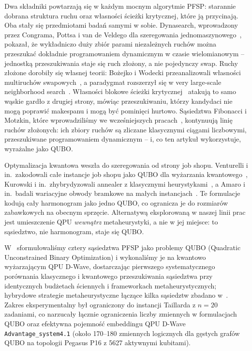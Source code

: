 \documentclass[11pt,a4paper]{article}
\begin{document}
Dwa składniki powtarzają się w każdym mocnym algorytmie PFSP: starannie
dobrana struktura ruchu oraz własności ścieżki krytycznej, które ją
przycinają. Oba stały się przedmiotami badań samymi w sobie. Dynasearch,
wprowadzony przez Congrama, Pottsa i van de Veldego dla szeregowania
jednomaszynowego~\citep{congram02}, pokazał, że wykładniczo duży zbiór
parami niezależnych ruchów można przeszukać dokładnie programowaniem
dynamicznym w czasie wielomianowym -- jednostką przeszukiwania staje
się ruch złożony, a nie pojedynczy swap. Ruchy złożone dorobiły się
własnej teorii: Bożejko i Wodecki przeanalizowali własności
multiruchów swapowych~\citep{bozejko2007}, a paradygmat rozszerzył się
w very large-scale neighborhood search~\citep{ahuja2002}. Własności
blokowe ścieżki krytycznej~\citep{nowicki96,ref_smutnicki,grabowski04}
atakują to samo wąskie gardło z drugiej strony, mówiąc przeszukiwaniu,
którzy kandydaci nie mogą poprawić makespanu i mogą być pominięci
hurtowo. Sąsiedztwa Fibonacci i Motzkin, które wprowadziliśmy we
wcześniejszych pracach~\citep{WojewodzkiBozejkoBPASTS2026,Motzkin_PWR_EXIT},
kontynuują linię ruchów złożonych: ich zbiory ruchów są zliczane
klasycznymi ciągami liczbowymi, przeszukiwane programowaniem
dynamicznym -- i, co ten artykuł wykorzystuje, wyrażalne jako QUBO.

Optymalizacja kwantowa weszła do szeregowania od strony job shopu.
Venturelli i in.\ zakodowali całe instancje job shopu jako QUBO dla
wyżarzania kwantowego~\citep{venturelli16}, Kurowski i in.\
zhybrydyzowali annealer z klasycznymi heurystykami~\citep{kurowski20},
a Amaro i in.\ badali wariacyjne obwody bramkowe na małych
instancjach~\citep{amaro22}. Te formulacje kodują cały harmonogram jako
jedno QUBO, co ogranicza je do rozmiarów zabawkowych na obecnym
sprzęcie. Alternatywą eksplorowaną w naszej linii prac jest umieszczenie
QPU \emph{wewnątrz} metaheurystyki, a nie w jej miejsce: to sąsiedztwo,
nie harmonogram, staje się QUBO.

W~\citep{WojewodzkiBozejkoBPASTS2026} sformułowaliśmy cztery
sąsiedztwa PFSP jako problemy QUBO (Quadratic Unconstrained Binary
Optimization) i wykonaliśmy je na kwantowo wyżarzającym QPU D-Wave,
dostarczając pierwszego systematycznego porównania klasycznego
i kwantowego przeszukiwania sąsiedztwa przy identycznych budżetach
ściennych i frameworkach metaheurystycznych; hybrydowe strategie
metaheurystyczne łączące kilka sąsiedztw zbadano
w~\citep{WojewodzkiBozejko2026}. Zakres eksperymentalny był ograniczony
do instancji Taillarda z $n=20$ zadaniami, co narzucały łącznie
ograniczenia liczby zmiennych w formulacjach QUBO oraz efektywna
pojemność embeddingu QPU D-Wave \texttt{Advantage\_system4.1} (około
170--180 zmiennych logicznych dla gęstych grafów QUBO na topologii
Pegasus P16 z 5627 aktywnymi kubitami).
\end{document}
